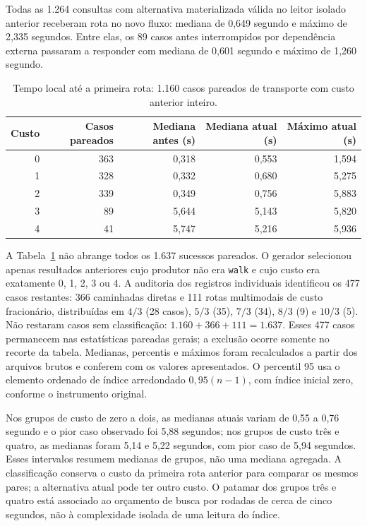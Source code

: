 Todas as 1.264 consultas com alternativa materializada válida no leitor isolado anterior receberam rota no novo fluxo: mediana de 0,649 segundo e máximo de 2,335 segundos. Entre elas, os 89 casos antes interrompidos por dependência externa passaram a responder com mediana de 0,601 segundo e máximo de 1,260 segundo.

\begin{table}[htbp]
\centering\small
\caption{Tempo local até a primeira rota: 1.160 casos pareados de transporte com custo anterior inteiro.}
\label{tab:latencia-baldeacoes-20261101}
\begin{tabular}{rrrrr}
\hline
Custo & Casos pareados & Mediana antes (s) & Mediana atual (s) & Máximo atual (s)\\
\hline
0 & 363 & 0,318 & 0,553 & 1,594\\
1 & 328 & 0,332 & 0,680 & 5,275\\
2 & 339 & 0,349 & 0,756 & 5,883\\
3 & 89 & 5,644 & 5,143 & 5,820\\
4 & 41 & 5,747 & 5,216 & 5,936\\
\hline
\end{tabular}
\end{table}

A Tabela~\ref{tab:latencia-baldeacoes-20261101} não abrange todos os 1.637 sucessos pareados. O gerador selecionou apenas resultados anteriores cujo produtor não era \texttt{walk} e cujo custo era exatamente 0, 1, 2, 3 ou 4. A auditoria dos registros individuais identificou os 477 casos restantes: 366 caminhadas diretas e 111 rotas multimodais de custo fracionário, distribuídas em $4/3$ (28 casos), $5/3$ (35), $7/3$ (34), $8/3$ (9) e $10/3$ (5). Não restaram casos sem classificação: $1.160+366+111=1.637$. Esses 477 casos permanecem nas estatísticas pareadas gerais; a exclusão ocorre somente no recorte da tabela. Medianas, percentis e máximos foram recalculados a partir dos arquivos brutos e conferem com os valores apresentados. O percentil 95 usa o elemento ordenado de índice arredondado $0{,}95(n-1)$, com índice inicial zero, conforme o instrumento original.

Nos grupos de custo de zero a dois, as medianas atuais variam de 0,55 a 0,76 segundo e o pior caso observado foi 5,88 segundos; nos grupos de custo três e quatro, as medianas foram 5,14 e 5,22 segundos, com pior caso de 5,94 segundos. Esses intervalos resumem medianas de grupos, não uma mediana agregada. A classificação conserva o custo da primeira rota anterior para comparar os mesmos pares; a alternativa atual pode ter outro custo. O patamar dos grupos três e quatro está associado ao orçamento de busca por rodadas de cerca de cinco segundos, não à complexidade isolada de uma leitura do índice.

